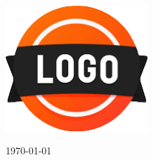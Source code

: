 \begin{titlepage}
    \centering
    \vspace*{3cm}
    \includegraphics[width=0.4\textwidth]{logos/logo_temp.png}\par\vspace{1cm}
    {\Huge\bfseries \doctitle \par}
    \vspace{1cm}
    {\large \myname \par}
    \vspace{1cm}
    {\large\today \par}
    \vspace{3cm}
\end{titlepage}